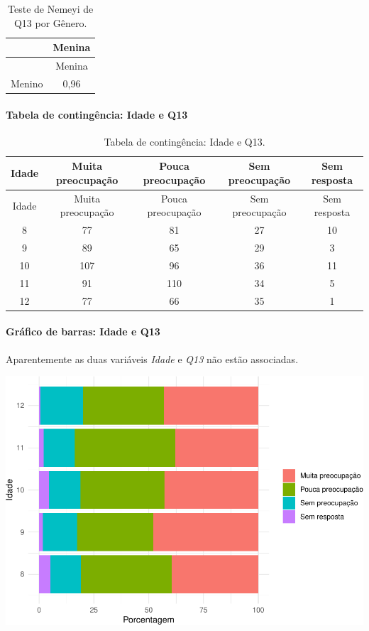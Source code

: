 \documentclass[]{article}
\let\oldparagraph\paragraph
\renewcommand{\paragraph}[1]{\oldparagraph{#1}\mbox{}}
\begin{document}
\begin{longtable}[]{@{}lc@{}}
\caption{\label{tab:unnamed-chunk-68}Teste de Nemeyi de Q13 por Gênero.}\tabularnewline
\toprule
& Menina\tabularnewline
\midrule
\endfirsthead
\toprule
& Menina\tabularnewline
\midrule
\endhead
Menino & 0,96\tabularnewline
\bottomrule
\end{longtable}

\cleardoublepage

\hypertarget{tabela-de-continguxeancia-idade-e-q13}{%
\paragraph{Tabela de contingência: Idade e Q13}\label{tabela-de-continguxeancia-idade-e-q13}}

\begin{longtable}[]{@{}ccccc@{}}
\caption{\label{tab:unnamed-chunk-69}Tabela de contingência: Idade e Q13.}\tabularnewline
\toprule
Idade & Muita preocupação & Pouca preocupação & Sem preocupação & Sem resposta\tabularnewline
\midrule
\endfirsthead
\toprule
Idade & Muita preocupação & Pouca preocupação & Sem preocupação & Sem resposta\tabularnewline
\midrule
\endhead
8 & 77 & 81 & 27 & 10\tabularnewline
9 & 89 & 65 & 29 & 3\tabularnewline
10 & 107 & 96 & 36 & 11\tabularnewline
11 & 91 & 110 & 34 & 5\tabularnewline
12 & 77 & 66 & 35 & 1\tabularnewline
\bottomrule
\end{longtable}

\hypertarget{gruxe1fico-de-barras-idade-e-q13}{%
\paragraph{Gráfico de barras: Idade e Q13}\label{gruxe1fico-de-barras-idade-e-q13}}

Aparentemente as duas variáveis \emph{Idade} e \emph{Q13} não estão associadas.

\begin{center}\includegraphics[width=0.75\linewidth]{relatorio_files/figure-latex/unnamed-chunk-70-1} \end{center}
\end{document}
